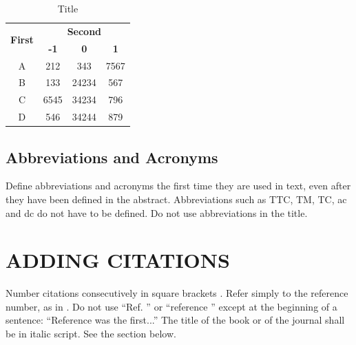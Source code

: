 \documentclass{esagnc}
\begin{document}
\begin{table}[t]
    \begin{center}
        \caption{Title}
        \label{tab:numbers}

        \begin{tabular}{ |c|c|c|c| } 
         \hline
        \multirow{2}{*}{\textbf{First}} & \multicolumn{3}{c|}{\textbf{Second}}\\ \cline{2-4}
                                        &  \textbf{-1} & \textbf{0} & \textbf{1}\\ \hline
        A	                            &   212        &	343     &	7567\\ \hline
        B	                            &   133	       &    24234   &	567 \\ \hline
        C	                            &   6545       &	34234	&   796 \\ \hline
        D                               &	546        &	34244   &   879 \\ \hline
        \end{tabular}
    \end{center}
\end{table}

\subsection{Abbreviations and Acronyms}

Define abbreviations and acronyms the first time they are used in text, even after they have been defined in the abstract. Abbreviations such as TTC, TM, TC, ac and dc do not have to be defined. Do not use abbreviations in the title.

\section{ADDING CITATIONS}

Number citations consecutively in square brackets \cite{johnson1988space}. Refer simply to the reference number, as in \cite{grun1985collisional}. Do not use ``Ref. \cite{grun1985collisional}'' or ``reference \cite{grun1985collisional}” except at the beginning of a sentence: ``Reference \cite{grun1985collisional} was the first...'' The title of the book or of the journal shall be in italic script. See the section below.



\end{document}

